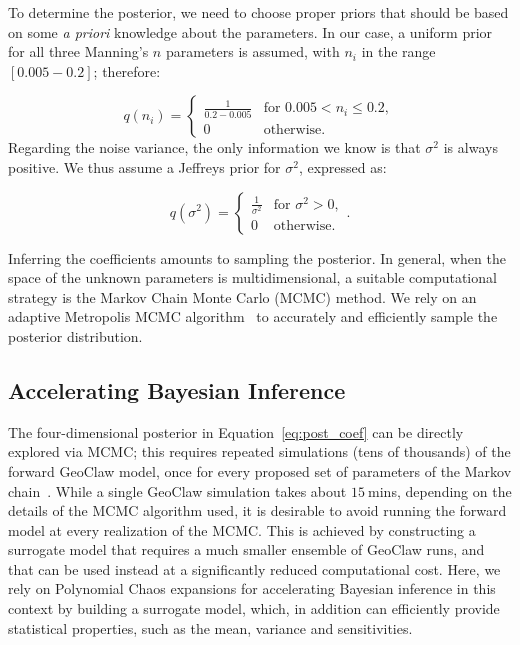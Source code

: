 \documentclass[review,12pt]{elsarticle}
\newcommand{\geoclaw}{{\sc GeoClaw}\xspace}
\begin{document}
To determine the posterior, we need to choose proper priors that should be based 
on some \emph{a priori} knowledge about the parameters. In our case, a uniform
prior for all three Manning's $n$ parameters is assumed, with $n_i$ in the range  $[0.005 - 0.2]$; therefore:

\begin{equation} 
q(n_i) = \begin{cases}
		\displaystyle \frac{1}{0.2-0.005} &\text{for~} 0.005 <  n_i \leq 0.2 ,  \\
		0 &\text{otherwise}.
\end{cases}
\end{equation}
Regarding the noise variance, the only information we know 
is that $\sigma^2$ is always positive.
We thus assume a Jeffreys prior \citep{sivia} for $\sigma^2$, expressed as:

\begin{equation} 
q(\sigma^2) =  \begin{cases}
		\displaystyle \frac{1}{\sigma^2} &\text{for~} \sigma^2 > 0,  \\
		0 &\text{otherwise}. 
		\end{cases}.
\label{eq:var_pr}
\end{equation}

Inferring the coefficients amounts to 
sampling the posterior. In general, when the space of the unknown 
parameters is multidimensional, a suitable computational strategy is 
the Markov Chain Monte  Carlo (MCMC) method. 
We rely on an adaptive Metropolis MCMC algorithm~\citep{Gareth2009,Haario2001} to
accurately and efficiently sample the posterior distribution.


\subsection{Accelerating Bayesian Inference}
\label{sec:uqpce}

The four-dimensional posterior in Equation~\eqref{eq:post_coef} can be directly
explored via MCMC; this requires repeated simulations (tens of thousands) of the forward \geoclaw model, 
once for every proposed set of parameters of the Markov chain~\cite{MarzoukNajm2009,Malinverno2002}. 
While a single \geoclaw simulation takes about $15~$mins, depending on the details of the MCMC algorithm used, 
it is desirable to avoid running the forward model at every realization of the MCMC. 
This is achieved by constructing a surrogate model that requires a much
smaller ensemble of \geoclaw runs, and that can be used instead
at a significantly reduced computational cost.  Here, we rely on
Polynomial Chaos expansions for accelerating Bayesian inference in this context 
by building a surrogate model, which, in addition can efficiently
provide statistical properties, such as the mean, variance and sensitivities. 
\end{document}
